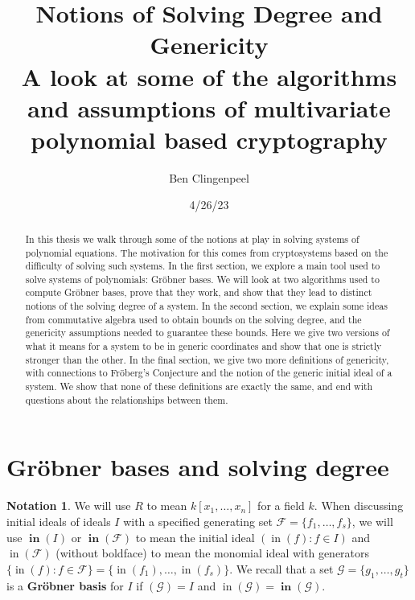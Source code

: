\documentclass[11pt]{article}
\title{\Huge \textbf{Notions of Solving Degree and Genericity} \\ \Large A look at some of the algorithms and assumptions of multivariate polynomial based cryptography}
\author{Ben Clingenpeel}
\date{\vspace{-.8em} 4/26/23}
\newcommand{\F}{\mathcal{F}}
\DeclareMathOperator{\init}{in}
\DeclareMathOperator{\Init}{\mathbf{in}}
\theoremstyle{definition}
\newtheorem*{notation}{Notation}
\begin{document}
\maketitle



\begin{abstract}
	\vspace{-1em}
	\noindent In this thesis we walk through some of the notions at play in solving systems of polynomial equations. The motivation for this comes from cryptosystems based on the difficulty of solving such systems. In the first section, we explore a main tool used to solve systems of polynomials: Gröbner bases. We will look at two algorithms used to compute Gröbner bases, prove that they work, and show that they lead to distinct notions of the solving degree of a system. In the second section, we explain some ideas from commutative algebra used to obtain bounds on the solving degree, and the genericity assumptions needed to guarantee these bounds. Here we give two versions of what it means for a system to be in generic coordinates and show that one is strictly stronger than the other. In the final section, we give two more definitions of genericity, with connections to Fröberg's Conjecture and the notion of the generic initial ideal of a system. We show that none of these definitions are exactly the same, and end with questions about the relationships between them. 
\end{abstract}

\section{Gröbner bases and solving degree}

\begin{notation}
	We will use $R$ to mean $k[x_1, \dots, x_n]$ for a field $k$. When discussing initial ideals of ideals $I$ with a specified generating set $\F = \{f_1, \dots, f_s\}$, we will use $\Init(I)$ or $\Init(\F)$ to mean the initial ideal $(\init(f): f \in I)$ and $\init(\F)$ (without boldface) to mean the monomial ideal with generators $\{\init(f): f \in \F\} = \{\init(f_1), \dots, \init(f_s)\}$. We recall that a set $\mathcal{G} = \{g_1, \dots, g_t\}$ is a \textbf{Gröbner basis} for $I$ if $(\mathcal{G}) = I$ and $\init(\mathcal{G}) = \Init(\mathcal{G})$.
\end{notation}
\end{document}
